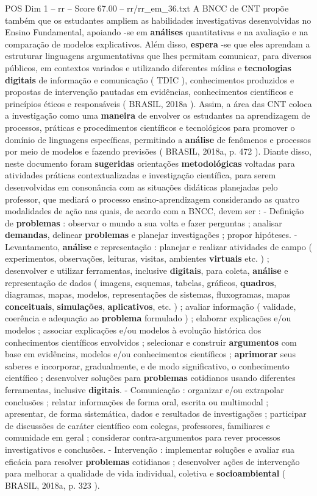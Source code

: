 \begin{textsample}{POS Dim 1 – rr – Score 67.00 – rr/rr\_em\_36.txt}
A BNCC de CNT propõe também que os estudantes ampliem as habilidades investigativas desenvolvidas no Ensino Fundamental, apoiando -se em \textbf{análises} quantitativas e na avaliação e na comparação de modelos explicativos.
Além disso, \textbf{espera} -se que eles aprendam a estruturar linguagens argumentativas que lhes permitam comunicar, para diversos públicos, em contextos variados e utilizando diferentes mídias e \textbf{tecnologias} \textbf{digitais} de informação e comunicação ( TDIC ), conhecimentos produzidos e propostas de intervenção pautadas em evidências, conhecimentos científicos e princípios éticos e responsáveis ( BRASIL, 2018a ).
Assim, a área das CNT coloca a investigação como uma \textbf{maneira} de envolver os estudantes na aprendizagem de processos, práticas e procedimentos científicos e tecnológicos para promover o domínio de linguagens específicas, permitindo a \textbf{análise} de fenômenos e processos por meio de modelos e fazendo previsões ( BRASIL, 2018a, p. 472 ).
Diante disso, neste documento foram \textbf{sugeridas} orientações \textbf{metodológicas} voltadas para atividades práticas contextualizadas e investigação científica, para serem desenvolvidas em consonância com as situações didáticas planejadas pelo professor, que mediará o processo ensino-aprendizagem considerando as quatro modalidades de ação nas quais, de acordo com a BNCC, devem ser : - Definição de \textbf{problemas} : observar o mundo a sua volta e fazer perguntas ; analisar \textbf{demandas}, delinear \textbf{problemas} e planejar investigações ; propor hipóteses. - Levantamento, \textbf{análise} e representação : planejar e realizar atividades de campo ( experimentos, observações, leituras, visitas, ambientes \textbf{virtuais} etc. ) ; desenvolver e utilizar ferramentas, inclusive \textbf{digitais}, para coleta, \textbf{análise} e representação de dados ( imagens, esquemas, tabelas, gráficos, \textbf{quadros}, diagramas, mapas, modelos, representações de sistemas, fluxogramas, mapas \textbf{conceituais}, \textbf{simulações}, \textbf{aplicativos}, etc. ) ; avaliar informação ( validade, coerência e adequação ao \textbf{problema} formulado ) ; elaborar explicações e/ou modelos ; associar explicações e/ou modelos à evolução histórica dos conhecimentos científicos envolvidos ; selecionar e construir \textbf{argumentos} com base em evidências, modelos e/ou conhecimentos científicos ; \textbf{aprimorar} seus saberes e incorporar, gradualmente, e de modo significativo, o conhecimento científico ; desenvolver soluções para \textbf{problemas} cotidianos usando diferentes ferramentas, inclusive \textbf{digitais}. - Comunicação : organizar e/ou extrapolar conclusões ; relatar informações de forma oral, escrita ou multimodal ; apresentar, de forma sistemática, dados e resultados de investigações ; participar de discussões de caráter científico com colegas, professores, familiares e comunidade em geral ; considerar contra-argumentos para rever processos investigativos e conclusões. - Intervenção : implementar soluções e avaliar sua eficácia para resolver \textbf{problemas} cotidianos ; desenvolver ações de intervenção para melhorar a qualidade de vida individual, coletiva e \textbf{socioambiental} ( BRASIL, 2018a, p. 323 ).

\end{textsample}
